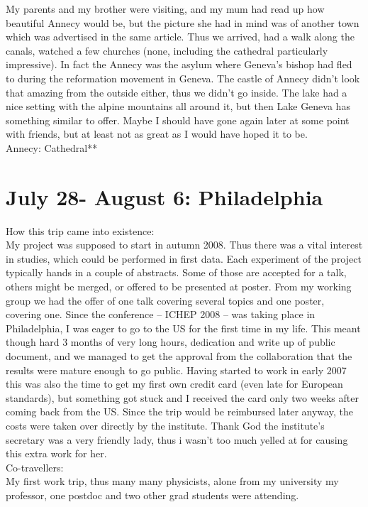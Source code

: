 My parents and my brother were visiting, and my mum had read up how beautiful Annecy would be, but the picture she had in mind was of another town which was advertised in the same article. Thus we arrived, had a walk along the canals, watched a few churches (none, including the cathedral particularly impressive). In fact the Annecy was the asylum where Geneva's bishop had fled to during the reformation movement in Geneva. The castle of Annecy didn't look that amazing from the outside either, thus we didn't go inside. The lake had a nice setting with the alpine mountains all around it, but then Lake Geneva has something similar to offer. Maybe I should have gone again later at some point with friends, but at least not as great as I would have hoped it to be.\\

Annecy: Cathedral**

\section{July 28- August 6: Philadelphia}
\label{2008:Philadelphia}

How this trip came into existence:\\
My project was supposed to start in autumn 2008. Thus there was a vital interest in studies, which could be performed in first data. Each experiment of the project typically hands in a couple of abstracts. Some of those are accepted for a talk, others might be merged, or offered to be presented at poster. From my working group we had the offer of one talk covering several topics and one poster, covering one. Since the conference -- ICHEP 2008 -- was taking place in Philadelphia, I was eager to go to the US for the first time in my life. This meant though hard 3 months of very long hours, dedication and write up of public document, and we managed to get the approval from the collaboration that the results were mature enough to go public. Having started to work in early 2007 this was also the time to get my first own credit card (even late for European standards), but something got stuck and I received the card only two weeks after coming back from the US. Since the trip would be reimbursed later anyway, the costs were taken over directly by the institute. Thank God the institute's secretary was a very friendly lady, thus i wasn't too much yelled at for causing this extra work for her.\\

Co-travellers:\\
My first work trip, thus many many physicists, alone from my university my professor, one postdoc and two other grad students were attending.\\ 

